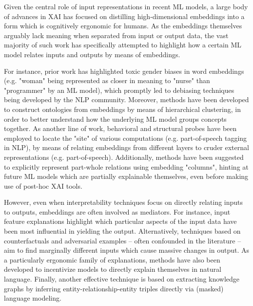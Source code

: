 Given the central role of input representations in recent ML models, a large body of advances in XAI has focused on distilling high-dimensional embeddings into a form which is cognitively ergonomic for humans. As the embeddings themselves arguably lack meaning when separated from input or output data, the vast majority of such work has specifically attempted to highlight how a certain ML model relates inputs and outputs by means of embeddings.

For instance, prior work has highlighted toxic gender biases in word embeddings (e.g. "woman" being represented as closer in meaning to "nurse" than "programmer" by an ML model), which promptly led to debiasing techniques being developed by the NLP community. Moreover, methods have been developed to construct ontologies from embeddings by means of hierarchical clustering, in order to better understand how the underlying ML model groups concepts together. As another line of work, behavioral and structural probes have been employed to locate the "site" of various computations (e.g. part-of-speech tagging in NLP), by means of relating embeddings from different layers to cruder external representations (e.g. part-of-speech). Additionally, methods have been suggested to explicitly represent part-whole relations using embedding "columns", hinting at future ML models which are partially explainable themselves, even before making use of post-hoc XAI tools.

However, even when interpretability techniques focus on directly relating inputs to outputs, embeddings are often involved as mediators. For instance, input feature explanations highlight which particular aspects of the input data have been most influential in yielding the output. Alternatively, techniques based on counterfactuals and adversarial examples -- often confounded in the literature -- aim to find marginally different inputs which cause massive changes in output. As a particularly ergonomic family of explanations, methods have also been developed to incentivize models to directly explain themselves in natural language. Finally, another effective technique is based on extracting knowledge graphs by inferring entity-relationship-entity triples directly via (masked) language modeling.

